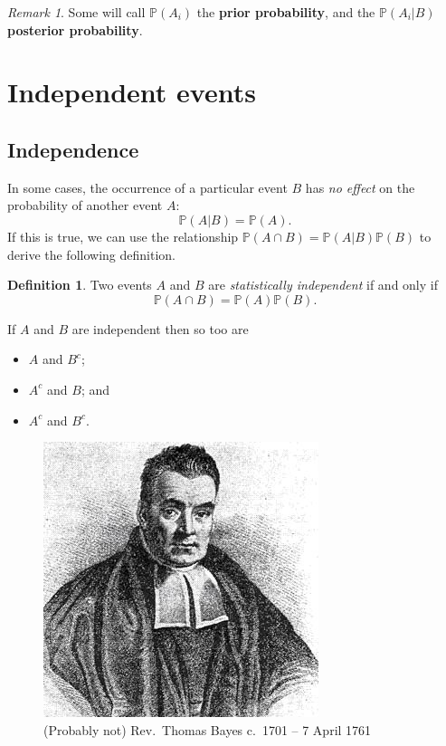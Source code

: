 \documentclass[
]{book}
\providecommand{\tightlist}{%
  \setlength{\itemsep}{0pt}\setlength{\parskip}{0pt}}
\newcommand{\bbP}{\mathbb{P}}
\theoremstyle{definition}
\newtheorem{definition}{Definition}[chapter]
\theoremstyle{definition}
\theoremstyle{definition}
\theoremstyle{definition}
\theoremstyle{remark}
\newtheorem*{remark}{Remark}
\begin{document}
\begin{remark}
Some will call \(\bbP(A_i)\) the \textbf{prior probability}, and the \(\bbP(A_i|B)\) \textbf{posterior probability}.
\end{remark}

\hypertarget{independent-events}{%
\section{Independent events}\label{independent-events}}

\hypertarget{independence}{%
\subsection{Independence}\label{independence}}

In some cases, the occurrence of a particular event \(B\) has \emph{no effect} on the probability of another event \(A\):
\[
  \bbP(A | B) = \bbP(A).
\]
If this is true, we can use the relationship \(\bbP(A \cap B) = \bbP(A | B)\bbP(B)\) to derive the following definition.

\begin{definition}
Two events \(A\) and \(B\) are \emph{statistically independent} if and only if
\[
  \bbP(A \cap B) = \bbP(A)\bbP(B).
\]
\end{definition}

If \(A\) and \(B\) are independent then so too are

\begin{itemize}
\tightlist
\item
  \(A\) and \(B^c\);
\item
  \(A^c\) and \(B\); and
\item
  \(A^c\) and \(B^c\).
\end{itemize}

\begin{figure}
\centering
\includegraphics{figure/bayes.jpg}
\caption{(Probably not) Rev.~Thomas Bayes c.~1701 -- 7 April 1761}
\end{figure}
\end{document}
